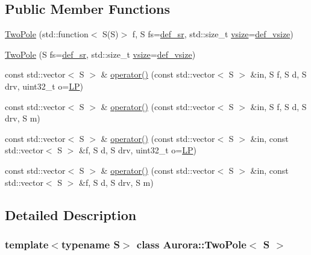 \subsection*{Public Member Functions}
\begin{DoxyCompactItemize}
\item 
\hyperlink{class_aurora_1_1_two_pole_a0545f0b722b88873bb798b6c0f2112e8}{Two\+Pole} (std\+::function$<$ S(S)$>$ f, S fs=\hyperlink{namespace_aurora_ad49263d809bea98dd422e95bc91bc03e}{def\+\_\+sr}, std\+::size\+\_\+t \hyperlink{class_aurora_1_1_snd_base_af9e21aaf411b17f7a8221c991ce5d291}{vsize}=\hyperlink{namespace_aurora_afaaddf667a06e7ce23c667a8b7295263}{def\+\_\+vsize})
\item 
\hyperlink{class_aurora_1_1_two_pole_afb7af09d7f8a80b18d875e78f4bcb419}{Two\+Pole} (S fs=\hyperlink{namespace_aurora_ad49263d809bea98dd422e95bc91bc03e}{def\+\_\+sr}, std\+::size\+\_\+t \hyperlink{class_aurora_1_1_snd_base_af9e21aaf411b17f7a8221c991ce5d291}{vsize}=\hyperlink{namespace_aurora_afaaddf667a06e7ce23c667a8b7295263}{def\+\_\+vsize})
\item 
const std\+::vector$<$ S $>$ \& \hyperlink{class_aurora_1_1_two_pole_a1b90d66b3f3e7a14b21ccbab94f56d3e}{operator()} (const std\+::vector$<$ S $>$ \&in, S f, S d, S drv, uint32\+\_\+t o=\hyperlink{namespace_aurora_a935301c39e9550e3c46ebe8dc165165faa9f81f17c7244e2198dba962e817cf89}{LP})
\item 
const std\+::vector$<$ S $>$ \& \hyperlink{class_aurora_1_1_two_pole_a93e4be5b3f2d85de446070a18deaf2dc}{operator()} (const std\+::vector$<$ S $>$ \&in, S f, S d, S drv, S m)
\item 
const std\+::vector$<$ S $>$ \& \hyperlink{class_aurora_1_1_two_pole_a91d565b51049c31f2f663227c14b9301}{operator()} (const std\+::vector$<$ S $>$ \&in, const std\+::vector$<$ S $>$ \&f, S d, S drv, uint32\+\_\+t o=\hyperlink{namespace_aurora_a935301c39e9550e3c46ebe8dc165165faa9f81f17c7244e2198dba962e817cf89}{LP})
\item 
const std\+::vector$<$ S $>$ \& \hyperlink{class_aurora_1_1_two_pole_a776b342b83577db48d8037a219f36471}{operator()} (const std\+::vector$<$ S $>$ \&in, const std\+::vector$<$ S $>$ \&f, S d, S drv, S m)
\end{DoxyCompactItemize}


\subsection{Detailed Description}
\subsubsection*{template$<$typename S$>$\newline
class Aurora\+::\+Two\+Pole$<$ S $>$}

